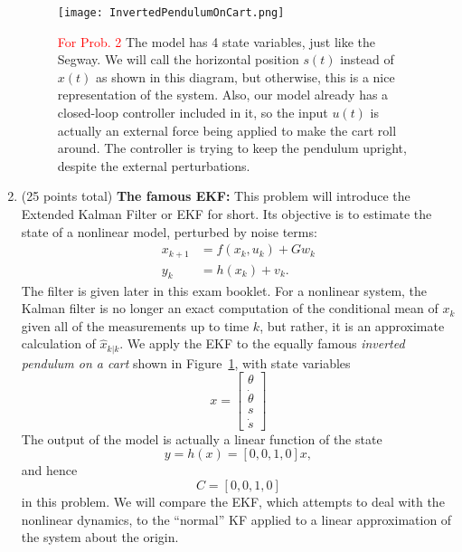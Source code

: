 \documentclass[letterpaper]{article}
\begin{document}
\begin{enumerate}
\setlength{\itemsep}{1cm}



\vspace*{2cm}
   \begin{figure}[h!]
   \label{Fig1}
	\begin{minipage}[t]{\linewidth}
		\centering
		\texttt{[image: InvertedPendulumOnCart.png]}
		\setlength{\abovecaptionskip}{0pt}
		\caption{\textcolor{red}{For Prob. 2} The model has 4 state variables, just like the Segway. We will call the horizontal position $s(t)$ instead of $x(t)$ as shown in this diagram, but otherwise, this is a nice representation of the system. Also, our model already has a closed-loop controller included in it, so the input $u(t)$ is actually an external force being applied to make the cart roll around. The controller is trying to keep the pendulum upright, despite the external perturbations.}
	\end{minipage}
\end{figure}

\newpage

\item (25 points total) \textbf{The famous EKF:} This problem will introduce the Extended Kalman Filter or EKF for short. Its objective is to estimate the state of a nonlinear model, perturbed by noise terms:
\begin{align*}
x_{k+1} &= f(x_k,u_k)+Gw_k \\
y_k &= h(x_k)+v_k.
\end{align*}
The filter is given later in this exam booklet. For a nonlinear system, the Kalman filter is no longer an exact computation of the conditional mean of $x_k$ given all of the measurements up to time $k$, but rather, it is an approximate calculation of $\widehat{x}_{k|k}$. We apply the EKF to the equally famous \textit{inverted pendulum on a cart} shown in Figure~\ref{Fig1}, with state variables
 $$x=\left[ \begin{array}{r} \theta \\ \dot{\theta} \\ s \\ \dot{s} \end{array} \right] $$
 The output of the model is actually a linear function of the state
 $$y=h(x) = [0, 0, 1, 0] x, $$
 and hence
 $$C=[0, 0, 1, 0]$$
 in this problem. We will compare the EKF, which attempts to deal with the nonlinear dynamics, to the ``normal'' KF applied to a linear approximation of the system about the origin.


\end{enumerate}
\end{document}
